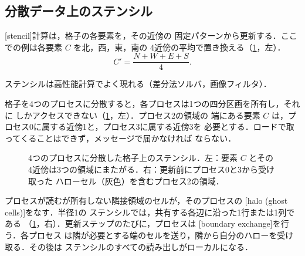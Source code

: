 \documentclass[../main.tex]{subfiles}
\begin{document}
\subsection{分散データ上のステンシル}

\begin{definition}[ステンシル]
  [stencil]計算は，格子の各要素を，その近傍の
  固定パターンから更新する．ここでの例は各要素 $C$ を北，西，東，南の
  4近傍の平均で置き換える（\cref{fig:l02-stencil-halo}，左）．
  \begin{equation}
    C' = \frac{N + W + E + S}{4}.
    \label{eq:l02-stencil}
  \end{equation}
\end{definition}

ステンシルは高性能計算でよく現れる（差分法ソルバ，画像フィルタ）．

格子を4つのプロセスに分散すると，各プロセスは1つの四分区画を所有し，それに
しかアクセスできない（\cref{fig:l02-stencil-halo}，左）．プロセス2の領域の
端にある要素 $C$ は，プロセス0に属する近傍1と，プロセス3に属する近傍3を
必要とする．ロードで取ってくることはできず，メッセージで届かなければ
ならない．

\begin{figure}[tb]
  \centering
  
  \caption{4つのプロセスに分散した格子上のステンシル．左：要素 $C$ とその
    4近傍は3つの領域にまたがる．右：更新前にプロセス0と3から受け取った
    ハローセル（灰色）を含むプロセス2の領域．}
  \label{fig:l02-stencil-halo}
\end{figure}

\begin{definition}[ハローと境界交換]
  プロセスが読むが所有しない隣接領域のセルが，そのプロセスの
  [halo (ghost cells)]をなす．半径1の
  ステンシルでは，共有する各辺に沿った1行または1列である
  （\cref{fig:l02-stencil-halo}，右）．更新ステップのたびに，プロセスは
  [boundary exchange]を行う．各プロセス
  は隣が必要とする端のセルを送り，隣から自分のハローを受け取る．その後は
  ステンシルのすべての読み出しがローカルになる．
\end{definition}
\end{document}
